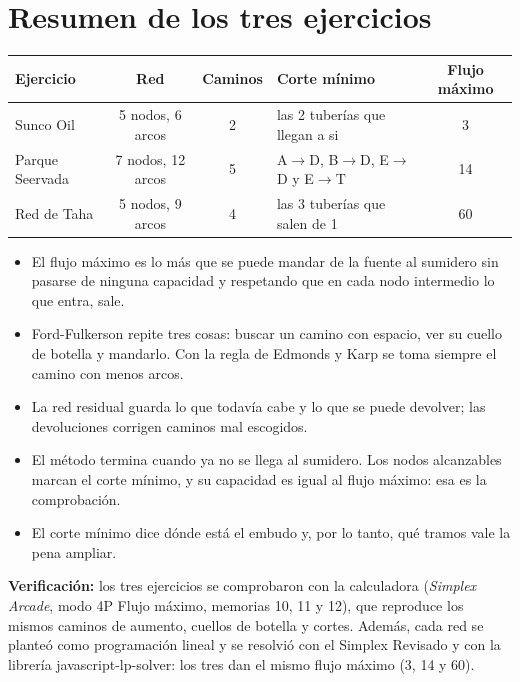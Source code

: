 \documentclass[11pt,a4paper]{article}
\begin{document}
\bigskip
\section*{Resumen de los tres ejercicios}
\begin{center}\small
\begin{tabular}{lccp{5.0cm}c}
\toprule
\textbf{Ejercicio} & \textbf{Red} & \textbf{Caminos} & \textbf{Corte mínimo} & \textbf{Flujo máximo} \\
\midrule
Sunco Oil & 5 nodos, 6 arcos & 2 & las 2 tuberías que llegan a si & 3 \\
Parque Seervada & 7 nodos, 12 arcos & 5 & A$\to$D, B$\to$D, E$\to$D y E$\to$T & 14 \\
Red de Taha & 5 nodos, 9 arcos & 4 & las 3 tuberías que salen de 1 & 60 \\
\bottomrule
\end{tabular}
\end{center}

\begin{idea}[Conclusiones]
\begin{itemize}[itemsep=2pt, leftmargin=*]
  \item El flujo máximo es lo más que se puede mandar de la fuente al sumidero sin pasarse de ninguna capacidad y
        respetando que en cada nodo intermedio lo que entra, sale.
  \item Ford-Fulkerson repite tres cosas: buscar un camino con espacio, ver su cuello de botella y mandarlo.
        Con la regla de Edmonds y Karp se toma siempre el camino con menos arcos.
  \item La red residual guarda lo que todavía cabe y lo que se puede devolver; las devoluciones corrigen caminos
        mal escogidos.
  \item El método termina cuando ya no se llega al sumidero. Los nodos alcanzables marcan el corte mínimo, y su
        capacidad es igual al flujo máximo: esa es la comprobación.
  \item El corte mínimo dice dónde está el embudo y, por lo tanto, qué tramos vale la pena ampliar.
\end{itemize}
\end{idea}

\textbf{Verificación:} los tres ejercicios se comprobaron con la calculadora (\emph{Simplex Arcade}, modo 4P Flujo
máximo, memorias 10, 11 y 12), que reproduce los mismos caminos de aumento, cuellos de botella y cortes. Además,
cada red se planteó como programación lineal y se resolvió con el Simplex Revisado y con la librería
javascript-lp-solver: los tres dan el mismo flujo máximo (3, 14 y 60).
\end{document}
